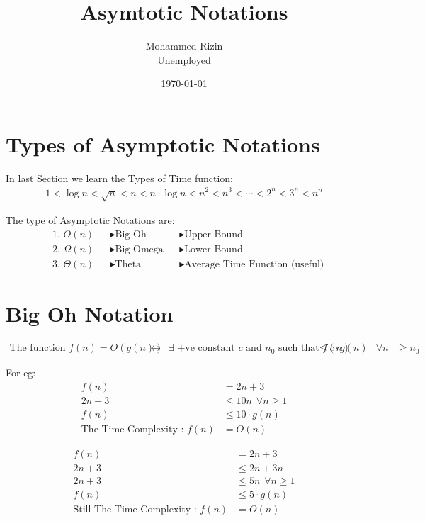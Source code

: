 \documentclass{article}
\title{Asymtotic Notations}
\author{Mohammed Rizin \\ Unemployed}
\date{\today}
\begin{document}
\maketitle

\section{Types of Asymptotic Notations}

In last Section we learn the Types of Time function:
\[
\boxed{
\begin{aligned}
    1 < \log{n} < \sqrt{n} < n < n\cdot \log{n} < n^2 < n^3 < \cdots < 2^n <  3^n < n^n
\end{aligned}
}
\]

The type of Asymptotic Notations are:
\[
\begin{aligned}
    &\text{1. } O(n) &&\blacktriangleright \text{Big Oh} &&\blacktriangleright \text{Upper Bound} \\
    &\text{2. } \Omega(n) &&\blacktriangleright \text{Big Omega} &&\blacktriangleright \text{Lower Bound} \\
    &\text{3. } \Theta(n) &&\blacktriangleright \text{Theta} &&\blacktriangleright \text{Average Time Function (useful)}
\end{aligned}
\]

\section{Big Oh Notation}
\[
\begin{aligned}
        \text{The function } f(n) = O{(g(n))} &\leftrightarrow &\exists \text{ +ve constant $c$ and } 
        n_0 \text{ such that } f{(n)} &\leq c \cdot g{(n)} &\forall n &\geq n_0  
\end{aligned}
\]

For eg:
\[
\begin{aligned}
        f(n) &= 2n + 3 \\
        2n+3 &\leq 10n \hspace{5pt} \forall n \geq 1 \\
        f(n) &\leq 10 \cdot g(n) \\
        \text{The Time Complexity : } f(n) &= O(n)
\end{aligned}
\]

\[
\begin{aligned}
        f(n) &= 2n + 3 \\
        2n+3 &\leq 2n + 3n \\
        2n+3 &\leq 5n \hspace{5pt} \forall n \geq 1 \\
        f(n) &\leq 5 \cdot g(n) \\
        \text{Still The Time Complexity : } f(n) &= O(n)
\end{aligned}
\]
\end{document}
